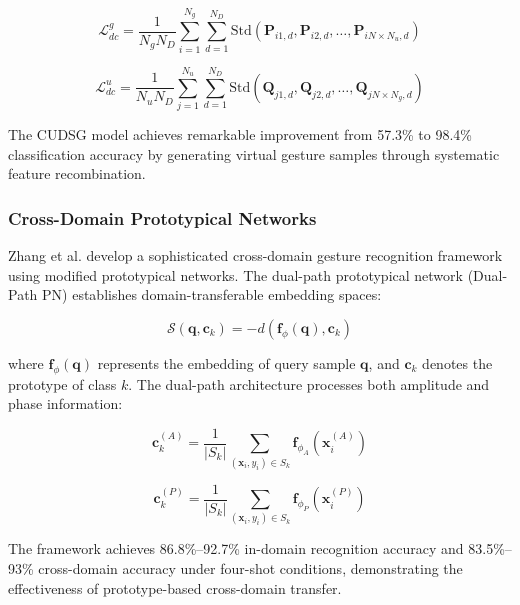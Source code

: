 \documentclass[journal]{IEEEtran}
\begin{document}
\begin{equation}
\mathcal{L}_{dc}^g = \frac{1}{N_g N_D} \sum_{i=1}^{N_g} \sum_{d=1}^{N_D} \text{Std}(\mathbf{P}_{i1,d}, \mathbf{P}_{i2,d}, \ldots, \mathbf{P}_{iN \times N_u,d})
\label{eq:gesture_decoupling_loss}
\end{equation}

\begin{equation}
\mathcal{L}_{dc}^u = \frac{1}{N_u N_D} \sum_{j=1}^{N_u} \sum_{d=1}^{N_D} \text{Std}(\mathbf{Q}_{j1,d}, \mathbf{Q}_{j2,d}, \ldots, \mathbf{Q}_{jN \times N_g,d})
\label{eq:identity_decoupling_loss}
\end{equation}

The CUDSG model achieves remarkable improvement from 57.3\% to 98.4\% classification accuracy by generating virtual gesture samples through systematic feature recombination.

\subsubsection{Cross-Domain Prototypical Networks}

Zhang et al. \cite{zhang2021wifi} develop a sophisticated cross-domain gesture recognition framework using modified prototypical networks. The dual-path prototypical network (Dual-Path PN) establishes domain-transferable embedding spaces:

\begin{equation}
\mathcal{S}(\mathbf{q}, \mathbf{c}_k) = -d(\mathbf{f}_{\phi}(\mathbf{q}), \mathbf{c}_k)
\label{eq:prototype_similarity}
\end{equation}

where $\mathbf{f}_{\phi}(\mathbf{q})$ represents the embedding of query sample $\mathbf{q}$, and $\mathbf{c}_k$ denotes the prototype of class $k$. The dual-path architecture processes both amplitude and phase information:

\begin{equation}
\mathbf{c}_k^{(A)} = \frac{1}{|S_k|} \sum_{(\mathbf{x}_i, y_i) \in S_k} \mathbf{f}_{\phi_A}(\mathbf{x}_i^{(A)})
\label{eq:amplitude_prototype}
\end{equation}

\begin{equation}
\mathbf{c}_k^{(P)} = \frac{1}{|S_k|} \sum_{(\mathbf{x}_i, y_i) \in S_k} \mathbf{f}_{\phi_P}(\mathbf{x}_i^{(P)})
\label{eq:phase_prototype}
\end{equation}

The framework achieves 86.8\%–92.7\% in-domain recognition accuracy and 83.5\%–93\% cross-domain accuracy under four-shot conditions, demonstrating the effectiveness of prototype-based cross-domain transfer.
\end{document}
